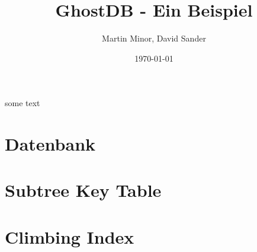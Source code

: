 \documentclass[a4paper, pdftex, notitlepage, parskip]{scrreprt}
\begin{document}
\title{\vspace{2cm} \Huge GhostDB - Ein Beispiel \vspace{2cm}}
\author{Martin Minor, David Sander}
\date{\today}
\maketitle
\vspace{2cm}
%
some text
%
\tableofcontents
\listoffigures
\listoftables
\pagestyle{headings}
%
\chapter{Datenbank}

\chapter{Subtree Key Table}

\chapter{Climbing Index}

%
\end{document}
